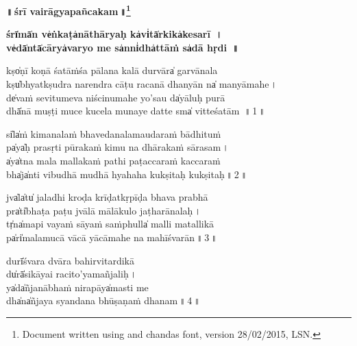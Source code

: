 \documentclass[parskip, DIV=14]{scrartcl}
\renewcommand{\thefootnote}{\fnsymbol{footnote}} %
\begin{document}

\vspace{-1.5cm}

\begin{center}
\textbf{{\Huge॥\,śrī vai॒rāgyapañcaka॒m\,॥\LARGE\let\thefootnote\relax\footnote{\color{lightgray} Document written using \XeLaTeX{} and chandas font, version 28/02/2015, LSN.}}}
\end{center}
\Large

\centering	

\vspace{0.5cm}

\textbf{\large śrī̍mā̍n ve̍ṅkaṭa̍nāthā॒ryaḥ ka̍vi̍tā̍rkika̍kesa॒rī॒ \,। \\
ve̍dā̍ntā̍cārya̍varyo॒ me sa̍nni̍dha̍ttāṁ sa̍dā hṛ॒di॒  \,॥}

\vspace{0.5cm}

kṣo̍ṇī koṇā śatāṁśa pālana ka॒lā du॒rvāra̍ ga॒rvānala \\
kṣu̍bhyatkṣudra narendra cāṭu raca॒nā dha॒nyān na̍ ma॒nyāma॒he॒\,। \\
de̍vaṁ sevitumeva niścinuma॒he yo॒'sau da̍yā॒luḥ pu॒rā \\
dhā̍nā muṣṭi muce kucela muna॒ye da॒tte sma̍ vi॒tteśa॒tā॒m \,॥\,1\,॥ \par 

si̍la̍ṁ kimanalaṁ bha॒veda॒na॒la॒mauda॒raṁ bā॒dhi॒tuṁ \\
pa̍ya̍ḥ prasṛti pūra॒kaṁ ki॒mu॒ na dhā॒ra॒kaṁ sā॒rasa॒m\,। \\
a̍ya̍tna mala malla॒kaṁ pa॒thi॒ pa॒ṭacca॒raṁ ka॒cca॒raṁ \\
bha̍ja̍nti vibudhā mu॒dhā hya॒ha॒ha ku॒kṣi॒taḥ ku॒kṣitaḥ॒\,॥\,2\,॥ \par 
 
jva̍la̍tu̍ jaladhi kroḍa krī॒ḍatkṛ॒pī॒ḍa bha॒va pra॒bhā\\
pra̍ti̍bhaṭa paṭu jvālā mā॒lāku॒lo ja॒ṭha॒rāna॒laḥ॒\,। \\
tṛ̍na̍mapi vayaṁ sāyaṁ sa॒ṁphulla̍ ma॒lli ma॒talli॒kā\\
pa̍ri̍malamucā vācā yā॒cāma॒he na mahīśvarān॒\,॥\,3\,॥ \par 

du॒rī̍śvara dvāra ba॒hirvi॒tardi॒kā \\
du̍rā̍sikāyai ra॒ci॒to'yamañjaliḥ॒\,। \\
ya̍da̍ñjanābhaṁ ni॒ra॒pāya̍ma॒sti॒ me \\
dha̍na̍ñjaya syandana bhū॒ṣa॒ṇaṁ dhana॒m\,॥\,4\,॥ \par 
\end{document}

